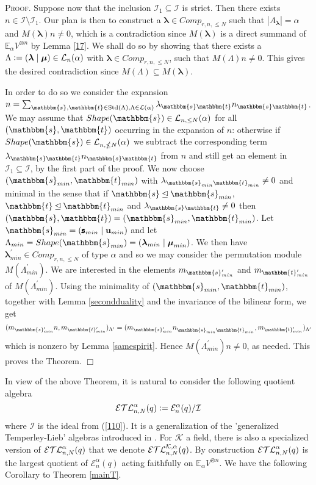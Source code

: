 \documentclass[10pt,a4,twoside,hidelinks,rm]{article}
\newcommand{\kk}{\mathcal{K}}
\newcommand\es{\mathbbm{s}}
\newcommand\et{\mathbbm{t}}
\newcommand\bu{\mathbf{u}}
\newcommand{\Bs}{\pmb{\mathfrak{s}}}
\newcommand{\MCN}{{ {Comp}}_{r,n, \le N}}
\newcommand{\std}{{\rm Std}}
\newcommand{\Ea}{ {\mathcal E}_n^{\alpha}(q)}
\newcommand{\EaTLK}{ {\cal ETL}_{n,N}^{ {\cal K}, \alpha}(q)}
\newcommand{\EaTL}{ {\cal ETL}_{n,N}^{  \alpha}(q)}
\newcommand\blambda{{\boldsymbol\lambda}}
\newcommand\be{\mathbb{E}}
\newcommand\bmu{{\boldsymbol\mu}}
\theoremstyle{plain}
\newenvironment{demo}
{\textsc{Proof.}} {\quad \hfill $\Box$}
\begin{document}
\begin{demo}
\medskip
Suppose now that the inclusion $ {\mathcal I}_1 \subseteq \mathcal I$ is strict. Then there
exists $ n \in { \mathcal I} \setminus {\mathcal I}_1 $.
Our plan is  then to construct a $ \blambda  \in \MCN $
such that $ | A_{\blambda} | = \alpha$ and
$ M(\blambda) n \neq 0 $,
which is a contradiction since $ M(\blambda) $ is a direct summand of
$ \be_{\alpha} V^{\otimes n} $ by Lemma \ref{17}. We shall do so by showing that there exists
a $ \Lambda := (\blambda \mid \bmu) \in {\cal L}_{n}(\alpha) $ with  $ \blambda  \in \MCN   $,
such that $ M(\Lambda) n \neq 0 $. This 
gives the desired contradiction since $ M(\Lambda)  \subseteq M(\blambda) $. 

In order to do so we consider the  
expansion $ n = \sum_{\es, \et \in \std(\Lambda), \Lambda \in {\cal L}(\alpha)} \lambda_{\es \et}n_{\es \et} $.
We may assume that $ Shape(\es) \in {\cal L}_{n, \le N}(\alpha) $ for all $ (\es, \et) $ 
occurring in the expansion of $ n $: otherwise if 
$ Shape(\es) \in {\cal L}_{n, \nleq N}(\alpha) $
we subtract the corresponding term $ \lambda_{\es \et}n_{\es \et} $ from $ n$ and
still get an element in $ {\mathcal I}_1 \subseteq \mathcal I$, by the first part of the proof.
We now choose $ (\es_{min}, \et_{min}) $ with 
$ \lambda_{\es_{min} \et_{min}} \neq 0$ and minimal in the sense that 
if $ \es \unlhd \es_{min}$, 
$ \et \unlhd \et_{min}$ and $ \lambda_{\es \et} \neq 0$ 
then $ (\es, \et ) = (\es_{min}, \et_{min} ) $. Let $ \es_{min} = (\Bs_{min } \mid \bu_{min}) $
and let $ \Lambda_{min}= Shape(\es_{min}) = (\blambda_{min}\mid \bmu_{min}) $.
We then have $ \blambda_{min}^{\prime}   \in \MCN $ of type $ \alpha$ 
and so we may consider the permutation module $ M(\Lambda^{\prime}_{min})$.
We are interested in the 
elements $ m_{\es_{min}^{\prime}} $ and $ m_{\et_{min}^{\prime}} $ of $ M(\Lambda^{\prime}_{min})$.
Using the minimality of $ (\es_{min}, \et_{min}) $, together with Lemma
{\ref{secondduality}} and the invariance of the bilinear form, we get
\begin{equation}
  (m_{\es_{min}^{\prime}} n , m_{\et_{min}^{\prime}})_{\Lambda^{\prime}} =
    (m_{\es_{min}^{\prime}} n^{}_{ \es^{}_{min} \et^{}_{min}}    , m_{\et_{min}^{\prime}})_{\Lambda^{\prime} }
\end{equation}
which is nonzero by Lemma \ref{samespirit}. Hence
$ M(\Lambda^{\prime}_{min}) n \neq 0 $, as needed. This proves the Theorem.
\end{demo}  


\medskip
In view of the above Theorem, it is natural to consider the following quotient algebra
\begin{equation}
\EaTL: =\Ea/\mathcal I
\end{equation}
where $ \mathcal I $ is the ideal from (\ref{110}). It is a generalization of
the 'generalized Temperley-Lieb' algebras introduced in \cite{Har}.
For $ \kk $ a field, there is also a specialized version of $ \EaTL $ that we denote
$ \EaTLK $.
By construction $ \EaTL $
is the largest quotient of $ \Ea $ 
acting faithfully on
$  \be_{\alpha} V^{\otimes n}$. We have the following Corollary to Theorem \ref{mainT}.
\end{document}

